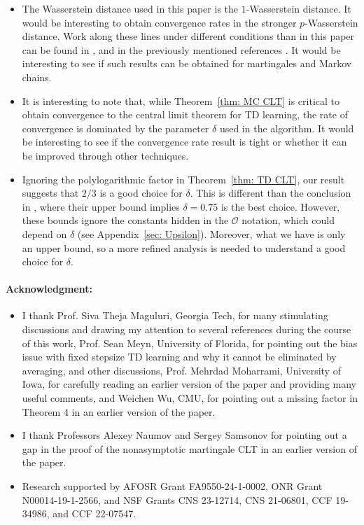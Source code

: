 \documentclass[11pt]{article}
\begin{document}
\begin{itemize}
    \item The Wasserstein distance used in this paper is the $1$-Wasserstein distance. It would be interesting to obtain convergence rates in the stronger $p$-Wasserstein distance. Work along these lines under different conditions than in this paper can be found in \citep{bonis2020stein}, and in the previously mentioned references \citep{courtade2019existence,zhai2018high}. It would be interesting to see if such results can be obtained for martingales and Markov chains.
    \item It is interesting to note that, while Theorem~\ref{thm: MC CLT} is critical to obtain convergence to the central limit theorem for TD learning, the rate of convergence is dominated by the parameter $\delta$ used in the algorithm. It would be interesting to see if the convergence rate result is tight or whether it can be improved through other techniques.
    \item Ignoring the polylogarithmic factor in Theorem~\ref{thm: TD CLT}, our result suggests that $2/3$ is a good choice for $\delta$. This is different than the conclusion in \citep{haque2023tight}, where their upper bound implies $\delta=0.75$ is the best choice. However, these bounds ignore the constants hidden in the $\mathcal{O}$ notation, which could depend on $\delta$ (see Appendix~\ref{sec: Upsilon}). Moreover, what we have is only an upper bound, so a more refined analysis is needed to understand a good choice for $\delta.$
\end{itemize}



\paragraph{Acknowledgment:} 
\begin{itemize}
    \item I thank Prof. Siva Theja Maguluri, Georgia Tech, for many stimulating discussions and drawing my attention to several references during the course of this work, Prof. Sean Meyn, University of Florida, for pointing out the bias issue with fixed stepsize TD learning and why it cannot be eliminated by averaging, and other discussions, Prof. Mehrdad Moharrami, University of Iowa, for carefully reading an earlier version of the paper and providing many useful comments, and Weichen Wu, CMU,  for pointing out a missing factor in Theorem 4 in an earlier version of the paper.
    \item I thank Professors Alexey Naumov and Sergey Samsonov for pointing out a gap in the proof of the nonasymptotic martingale CLT in an earlier version of the paper.
    \item Research supported by AFOSR Grant FA9550-24-1-0002, ONR Grant N00014-19-1-2566, and NSF Grants CNS 23-12714, CNS 21-06801, CCF 19-34986, and CCF 22-07547.
\end{itemize}
\end{document}
